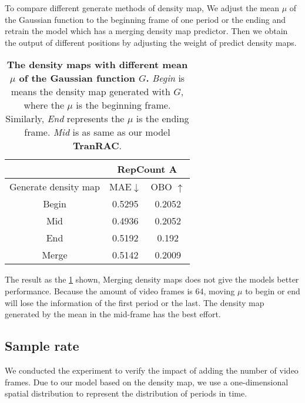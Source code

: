 \documentclass[10pt,twocolumn,letterpaper]{article}
\begin{document}
To compare different generate methods of density map, We adjust the mean $\mu$ of the Gaussian function to the beginning frame of one period or the ending and retrain the model which has a merging density map predictor. Then we obtain the output of different positions by adjusting the weight of predict density maps.
\begin{table}[ht]

	\centering
	\begin{tabular}{c|cc}
		\hline
		                     & \multicolumn{2}{c}{RepCount A}                        \\ \hline
		Generate density map & \multicolumn{1}{c|}{MAE$\downarrow$} & OBO $\uparrow$ \\ \hline
		Begin                & \multicolumn{1}{c|}{0.5295}          & 0.2052         \\
		Mid                  & \multicolumn{1}{c|}{0.4936}          & 0.2052         \\
		End                  & \multicolumn{1}{c|}{0.5192}          & 0.192          \\
		Merge                & \multicolumn{1}{c|}{0.5142}          & 0.2009         \\ \hline
	\end{tabular}

	\caption{
		\textbf{The density maps with different mean $\mu$ of the Gaussian function $G$.} \emph{Begin} is means the density map generated with $G$, where the $\mu$ is the beginning frame. Similarly, \emph{End} represents the $\mu$ is the ending frame. \emph{Mid} is as same as our model \textbf{TranRAC}.
	}
	\label{tab:multi density maps}
\end{table}

The result as the \cref{tab:multi density maps} shown, Merging density maps does not give the models better performance. Because the amount of video frames is 64, moving $\mu$ to begin or end will lose the information of the first period or the last. The density map generated by the mean in the mid-frame has the best effort.

\subsection{Sample rate}

We conducted the experiment to verify the impact of adding the number of video frames. Due to our model based on the density map, we use a one-dimensional spatial distribution to represent the distribution of periods in time. 
\end{document}
